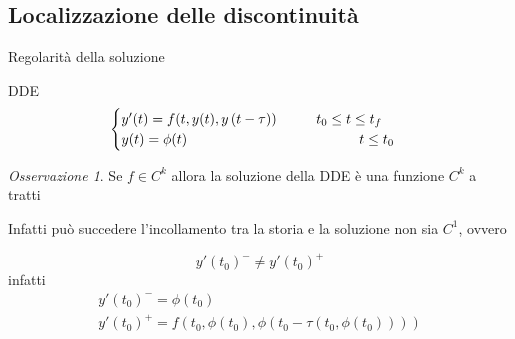 \documentclass[intlimits]{beamer}
\numberwithin{equation}{section}
\theoremstyle{plain}
\theoremstyle{definition}
\theoremstyle{remark}
\newtheorem{oss}[teor]{Osservazione}
\begin{document}
\subsection{Localizzazione delle discontinuità}

\begin{frame}{Regolarità della soluzione}

\pause
\begin{block}{DDE}
$$
\begin{cases}
 y'(t)=f(t,y(t),y \left( t-\tau \right))	\hspace{1cm}	t_0 \le t \le t_f		\\
 y(t)=\phi(t)					\hspace{4.35cm}		t \le t_0
\end{cases}
$$
\end{block}

\pause
\begin{oss}
Se $f \in C^k$ allora la soluzione della DDE è una funzione $C^k$ a tratti
\end{oss}

\pause
Infatti può succedere l'incollamento tra la storia e la soluzione non sia $C^1$, ovvero

$$
y'(t_0)^- \ne y'(t_0)^+
$$
\pause
infatti
$$
\begin{array}{l}
y'(t_0)^- = \phi(t_0)											\\
y'(t_0)^+ = f(t_0, \phi(t_0),\phi(t_0 - \tau(t_0,\phi(t_0))))
\end{array}
$$
\end{frame}
\end{document}
